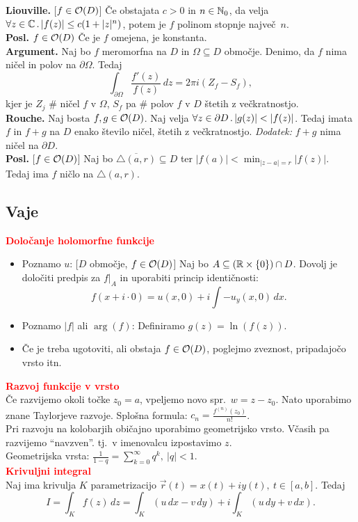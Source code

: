 \documentclass[a4paper,oneside,8pt,landscape]{extarticle}
\begin{document}
\begin{multicols*}{3}
%
\textbf{Liouville.} [\(f \in \mathcal{O}(D)\)] Če obstajata \(c > 0\) in \(n \in \mathbb{N}_0\), da velja \(\forall z \in \mathbb{C} \,.\, |f(z)| \leq c (1 + |z|^n)\), potem je \(f\) polinom stopnje največ~\(n\).\\
%
\textbf{Posl.} \(f \in \mathcal{O}(D)\) Če je \(f\) omejena, je konstanta.\\
%
\textbf{Argument.} Naj bo \(f\) meromorfna na \(D\) in \(\Omega \subseteq D\) območje. Denimo, da \(f\) nima ničel in polov na \(\partial \Omega\). Tedaj
\[
    \int_{\partial \Omega} \frac{f'(z)}{f(z)} \, dz = 2 \pi i(Z_f - S_f),
\]
kjer je \(Z_j\) \# ničel \(f\) v \(\Omega\), \(S_f\) pa \# polov \(f\) v \(D\) štetih z večkratnostjo.\\
%
\textbf{Rouche.} Naj bosta \(f, g \in \mathcal{O}(D)\). Naj velja \(\forall z \in \partial D \,.\, |g(z)| < |f(z)|\). Tedaj imata \(f\) in \(f+ g\) na \(D\) enako število ničel, štetih z večkratnostjo. \emph{Dodatek:} \(f + g\) nima ničel na \(\partial D\).\\
\textbf{Posl.} [\(f \in \mathcal{O}(D)\)] Naj bo \(\overline{\triangle(a, r)} \subseteq D\) ter \(|f(a)| < \min_{|z-a|=r}|f(z)|\). Tedaj ima \(f\) ničlo na \(\triangle(a, r)\).
\subsection*{Vaje}
%
\textbf{\textcolor{red}{Določanje holomorfne funkcije}}
\begin{itemize}
    \item Poznamo \(u\): [\(D\) območje, \(f \in \mathcal{O}(D)\)] Naj bo \(A \subseteq (\mathbb{R} \times \{0\}) \cap D\). Dovolj je določiti predpis za \(f|_{A}\) in uporabiti princip identičnosti:
    \[
        f(x + i \cdot 0) = u(x, 0) + i \int -u_y(x, 0) \, dx.
    \]
    \item Poznamo \(|f|\) ali \(\arg(f)\): Definiramo \(g(z) = \ln(f(z))\).
    \item Če je treba ugotoviti, ali obstaja \(f \in \mathcal{O}(D)\), poglejmo zveznost, pripadajočo vrsto itn.
\end{itemize}
%
\textbf{\textcolor{red}{Razvoj funkcije v vrsto}}\\
Če razvijemo okoli točke \(z_0 = a\), vpeljemo novo spr.\ \(w = z - z_0\). Nato uporabimo znane Taylorjeve razvoje. Splošna formula: \(c_n = \frac{f^{(n)}(z_0)}{n!}\).\\
%
Pri razvoju na kolobarjih običajno uporabimo geometrijsko vrsto. Včasih pa razvijemo "`navzven"'. tj.\ v imenovalcu izpostavimo \(z\).\\
Geometrijska vrsta: \(\frac{1}{1-q} = \sum_{k=0}^{\infty}q^k, \ |q| < 1\).\\
%
\textbf{\textcolor{red}{Krivuljni integral}}\\
Naj ima krivulja \(K\) parametrizacijo \(\vec{r}(t) =  x(t) + iy(t), \ t \in [a,b]\). Tedaj 
\[
    I = \int_{K} f(z) \, dz = \int_{K} (u\, dx - v\, dy) + i \int_{K} (u\, dy + v\, dx).
\]
\ 


\end{multicols*}
\end{document}
